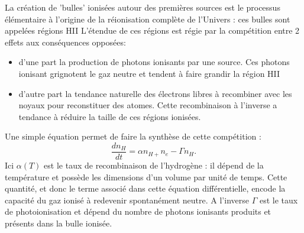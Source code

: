 La création de 'bulles' ionisées autour des premières sources est le processus élémentaire à l'origine de la réionisation complète de l'Univers : ces bulles sont appelées régions HII L'étendue de ces régions est régie par la compétition entre 2 effets aux conséquences opposées:
\begin{itemize}
\item d'une part la production de photons ionisants par une source. Ces photons ionisant grignotent le gaz neutre et tendent à faire grandir la région HII
\item d'autre part la tendance naturelle des électrons libres à recombiner avec les noyaux pour reconstituer des atomes. Cette recombinaison à l'inverse a tendance à réduire la taille de ces régions ionisées.
\end{itemize}
Une simple équation permet de faire la synthèse de cette compétition :
\begin{equation}
\frac{d n_H}{dt}=\alpha n_{H+}n_e -\Gamma n_H.
\end{equation}
Ici $\alpha(T)$ est le taux de recombinaison de l'hydrogène : il dépend de la température et possède les dimensions d'un volume par unité de temps. Cette quantité, et donc le terme associé dans cette équation différentielle, encode la capacité du gaz ionisé à redevenir spontanément neutre.  A l'inverse $\Gamma$ est le taux de photoionisation et dépend du nombre de photons ionisants produits et présents dans la bulle ionisée.

